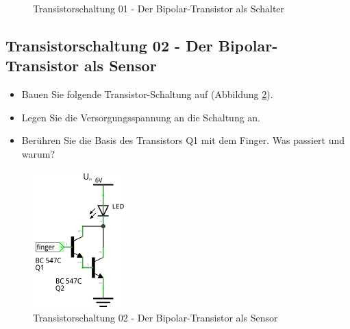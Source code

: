\begin{figure}[H]
	\centering
	\caption{Transistorschaltung 01 - Der Bipolar-Transistor als Schalter}
	\label{s01}
\end{figure}


\subsection[Der Bipolar-Transistor als Sensor]{Transistorschaltung 02 - Der Bipolar-Transistor als Sensor}

\begin{itemize}
\itemsep1pt\parskip0pt
\item Bauen Sie folgende Transistor-Schaltung auf (Abbildung \ref{s02}). 
\item Legen Sie die Versorgungsspannung an die Schaltung an.
\item Berühren Sie die Basis des Transistors Q1 mit dem Finger. Was passiert und warum?
\end{itemize}

\begin{figure}[H]
	\centering
	\includegraphics[scale=1.6]{Transistor/Schaltungen/NPN_Sensor.pdf}
	\caption{Transistorschaltung 02 - Der Bipolar-Transistor als Sensor}
	\label{s02}
\end{figure}

